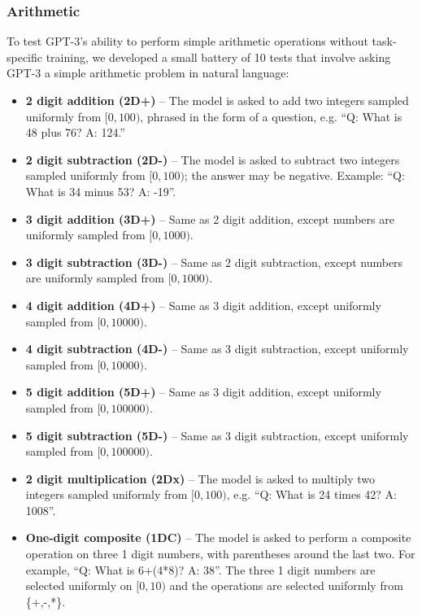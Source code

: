 \documentclass{article}
\begin{document}
        \subsubsection{Arithmetic}
        \label{section:Arithmetic}

To test GPT-3's ability to perform simple arithmetic operations without task-specific training, we developed a small battery of 10 tests that involve asking GPT-3 a simple arithmetic problem in natural language:

\begin{itemize}
    \item \textbf{2 digit addition (2D+)} -- The model is asked to add two integers sampled uniformly from $[0, 100)$, phrased in the form of a question, e.g. ``Q: What is 48 plus 76? A: 124.''
    \item \textbf{2 digit subtraction (2D-)} -- The model is asked to subtract two integers sampled uniformly from $[0, 100)$; the answer may be negative.  Example: ``Q: What is 34 minus 53? A: -19''.
    \item \textbf{3 digit addition (3D+)} -- Same as 2 digit addition, except numbers are uniformly sampled from $[0, 1000)$.
    \item \textbf{3 digit subtraction (3D-)} -- Same as 2 digit subtraction, except numbers are uniformly sampled from $[0, 1000)$.
    \item \textbf{4 digit addition (4D+)} -- Same as 3 digit addition, except uniformly sampled from $[0, 10000)$.
    \item \textbf{4 digit subtraction (4D-)} -- Same as 3 digit subtraction, except uniformly sampled from $[0, 10000)$.
    \item \textbf{5 digit addition (5D+)} -- Same as 3 digit addition, except uniformly sampled from $[0, 100000)$.
    \item \textbf{5 digit subtraction (5D-)} -- Same as 3 digit subtraction, except uniformly sampled from $[0, 100000)$.
   \item \textbf{2 digit multiplication (2Dx)} -- The model is asked to multiply two integers sampled uniformly from $[0, 100)$, e.g. ``Q: What is 24 times 42? A: 1008''.
    \item \textbf{One-digit composite (1DC)} -- The model is asked to perform a composite operation on three 1 digit numbers, with parentheses around the last two. For example, ``Q: What is 6+(4*8)? A: 38''. The three 1 digit numbers are selected uniformly on $[0, 10)$ and the operations are selected uniformly from \{+,-,*\}.
\end{itemize}
\end{document}
